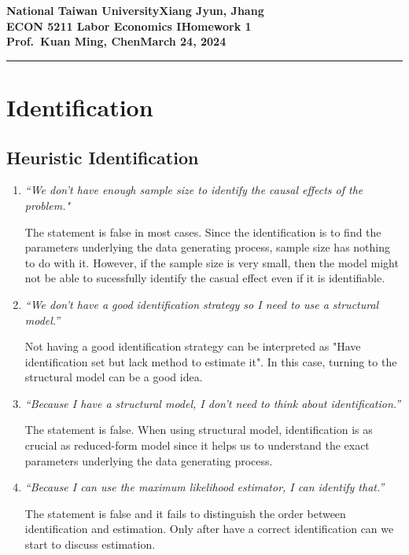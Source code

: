 \documentclass[11pt]{article}
\newcommand{\myname}{Xiang Jyun, Jhang}
\newcommand{\assignment}{Homework 1}
\newcommand{\duedate}{March 24, 2024}
\begin{document}
\textbf{National Taiwan University}\hfill\textbf{\myname}\\[0.01in]
\textbf{ECON 5211 Labor Economics I}\hfill\textbf{\assignment}\\[0.01in]
\textbf{Prof.\ Kuan Ming, Chen}\hfill\textbf{\duedate}\\
\smallskip\hrule\bigskip



\section{Identification}

    \subsection{Heuristic Identification}
    
        \begin{enumerate}

            \item{\textit{“We don't have enough sample size to identify the causal effects of the problem."}}
            
                The statement is false in most cases. Since the identification is to find the parameters underlying the data generating process, sample size has nothing to do with it. However, if the sample size is very small, then the model might not be able to sucessfully identify the casual effect even if it is identifiable.
            
            \item{\textit{“We don't have a good identification strategy so I need to use a structural model.”}}
            
                Not having a good identification strategy can be interpreted as "Have identification set but lack method to estimate it". In this case, turning to the structural model can be a good idea.
            
            \item{\textit{“Because I have a structural model, I don't need to think about identification.”}}
            
                The statement is false. When using structural model, identification is as crucial as reduced-form model since it helps us to understand the exact parameters underlying the data generating process.

            \item{\textit{“Because I can use the maximum likelihood estimator, I can identify that.”}}
            
                The statement is false and it fails to distinguish the order between identification and estimation. Only after have a correct identification can we start to discuss estimation.

        \end{enumerate}
\end{document}
